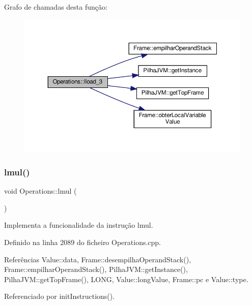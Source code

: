 Grafo de chamadas desta função\+:\nopagebreak
\begin{figure}[H]
\begin{center}
\leavevmode
\includegraphics[width=350pt]{classOperations_af2f8b1e41b734f43e73d9d6811eb427b_cgraph}
\end{center}
\end{figure}
\mbox{\label{classOperations_ae23a8dfdcc02432b6f880334fa4a7c59}} 
\subsubsection{\texorpdfstring{lmul()}{lmul()}}
{\footnotesize\ttfamily void Operations\+::lmul (\begin{DoxyParamCaption}{ }\end{DoxyParamCaption})\hspace{0.3cm}{\ttfamily [private]}}



Implementa a funcionalidade da instrução lmul. 



Definido na linha 2089 do ficheiro Operations.\+cpp.



Referências Value\+::data, Frame\+::desempilha\+Operand\+Stack(), Frame\+::empilhar\+Operand\+Stack(), Pilha\+J\+V\+M\+::get\+Instance(), Pilha\+J\+V\+M\+::get\+Top\+Frame(), L\+O\+NG, Value\+::long\+Value, Frame\+::pc e Value\+::type.



Referenciado por init\+Instructions().

